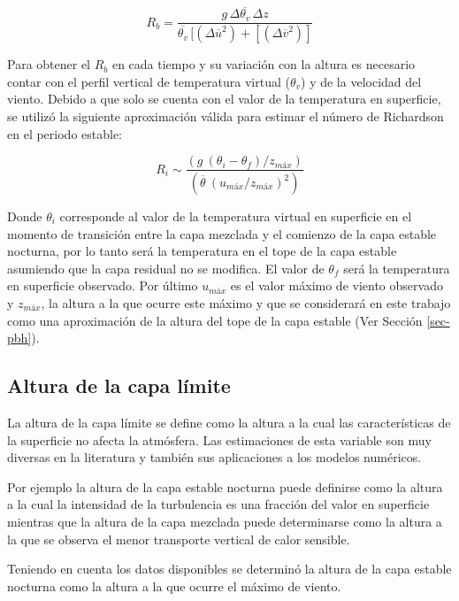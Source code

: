 \documentclass[12pt,spanish,oneside]{book}
\begin{document}
\begin{equation} \label{eq-ri2}
R_b = \frac{g \, \Delta \overline{\theta_v} \, \Delta z}{\overline{\theta_v} \, [(\Delta \overline{u}^2) + [(\Delta \overline{v}^2)]}
\end{equation}

Para obtener el \(R_b\) en cada tiempo y su variación con la altura es
necesario contar con el perfil vertical de temperatura virtual
(\(\theta_v\)) y de la velocidad del viento. Debido a que solo se cuenta
con el valor de la temperatura en superficie, se utilizó la siguiente
aproximación válida para estimar el número de Richardson en el periodo
estable:

\begin{equation} \label{eq-ri3}
R_i \sim \frac{(g  \: (\theta_i - \theta_f)/z_{máx})}{(\overline{\theta} \: (u_{máx}/z_{máx})^2)}
\end{equation}

Donde \(\theta_i\) corresponde al valor de la temperatura virtual en
superficie en el momento de transición entre la capa mezclada y el
comienzo de la capa estable nocturna, por lo tanto será la temperatura
en el tope de la capa estable asumiendo que la capa residual no se
modifica. El valor de \(\theta_f\) será la temperatura en superficie
observado. Por último \(u_{máx}\) es el valor máximo de viento observado
y \(z_{máx}\), la altura a la que ocurre este máximo y que se
considerará en este trabajo como una aproximación de la altura del tope
de la capa estable (Ver Sección \ref{sec-pbh}).

\subsection{\texorpdfstring{Altura de la capa límite
\label{sec-pbh}}{Altura de la capa límite }}\label{altura-de-la-capa-limite}

La altura de la capa límite se define como la altura a la cual las
características de la superficie no afecta la atmósfera. Las
estimaciones de esta variable son muy diversas en la literatura y
también sus aplicaciones a los modelos numéricos.

Por ejemplo la altura de la capa estable nocturna puede definirse como
la altura a la cual la intensidad de la turbulencia es una fracción del
valor en superficie mientras que la altura de la capa mezclada puede
determinarse como la altura a la que se observa el menor transporte
vertical de calor sensible.

Teniendo en cuenta los datos disponibles se determinó la altura de la
capa estable nocturna como la altura a la que ocurre el máximo de
viento.
\end{document}
